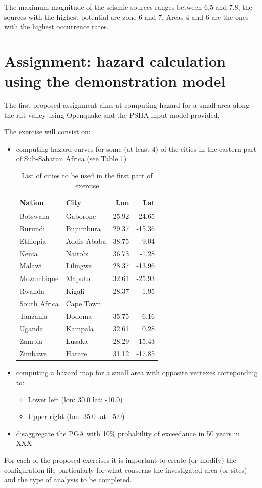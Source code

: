 The maximum magnitude of the seismic sources ranges between 6.5 
and 7.8; the sources with the highest potential are zone 6 and 7.  
Areas 4 and 6 are the ones with the highest occurrence rates.
%
\section{Assignment: hazard calculation using the demonstration model}
%
The first proposed assignment aims at computing hazard for a small area 
along the rift valley using Openquake and the PSHA input model 
provided.

The exercise will consist on:
\begin{itemize}
    \item computing hazard curves for some (at least 4) of the cities 
        in the eastern part of Sub-Saharan Africa (see Table \ref{tab:cities})
        \begin{table}
            \centering
            \begin{tabular}{llrr} \hline
            \bf{Nation} & \bf{City} & \bf{Lon} & \bf{Lat} \\ \hline
            Botswana    & Gaborone  & 25.92 & -24.65 \\
            Burundi     & Bujumbura & 29.37 &  -15.36 \\
            Ethiopia    & Addis Ababa & 38.75 &  9.04 \\
            Kenia       & Nairobi   & 36.73 &  -1.28 \\
            Malawi      & Lilingwe  & 28.37 &  -13.96 \\
            Mozambique  & Maputo    & 32.61 & -25.93 \\
            Rwanda      & Kigali    & 28.37 &  -1.95 \\
            South Africa & Cape Town & & \\
            Tanzania    & Dodoma    & 35.75 &  -6.16 \\
            Uganda      & Kampala   & 32.61 &  0.28 \\
            Zambia      & Lusaka    & 28.29 &  -15.43 \\
            Zimbawe     & Harare    & 31.12 &  -17.85 \\
            \hline
            \end{tabular}
            \label{tab:cities}
            \caption{List of cities to be used in the first part of exercise}
        \end{table}
    \item computing a hazard map for a small area with opposite vertexes 
        correponding to: 
        \begin{itemize}
            \item Lower left (lon: 30.0 lat: -10.0)
            \item Upper right (lon: 35.0 lat: -5.0)
        \end{itemize}
    \item disaggregate the PGA with 10\% probability of exceedance in 50 
        years in XXX
\end{itemize}
%
For each of the proposed exercises it is important to create (or modify) 
the configuration file particularly for what conserns the investigated 
area (or sites) and the type of analysis to be completed.
